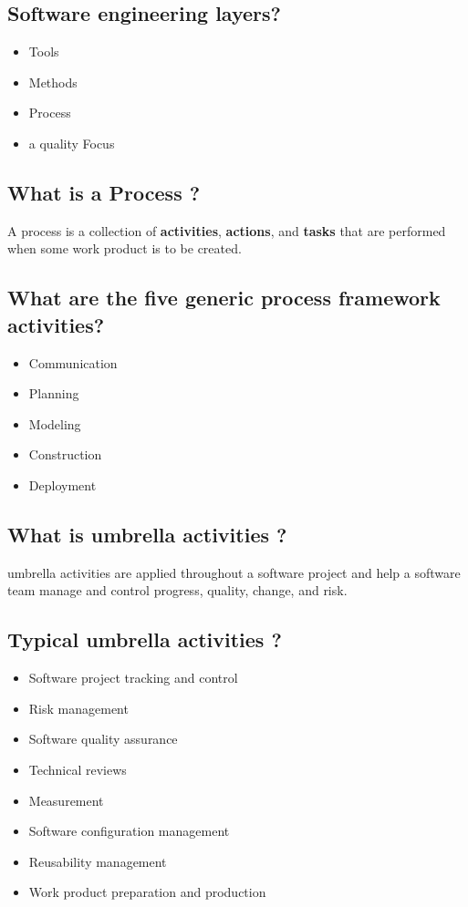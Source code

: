 \documentclass[12pt]{article}
\begin{document}
\subsection{Software engineering layers?}

\begin{itemize}
	\item Tools
	\item Methods
	\item Process
	\item a quality Focus
\end{itemize}


\subsection{What is a Process ?}

A process is a collection of \textbf{activities}, \textbf{actions}, and \textbf{tasks} that are performed when
some work product is to be created.



\subsection{What are the five generic process framework activities?}

\begin{itemize}
	\item Communication
	\item Planning
	\item Modeling
	\item Construction
	\item Deployment
\end{itemize}


\subsection{What is umbrella activities ?}

umbrella activities are applied throughout a software project and help a software team manage and control progress, quality,
change, and risk.

\newpage

\subsection{Typical umbrella activities ?}

\begin{itemize}
	\item Software project tracking and control
	\item Risk management
	\item Software quality assurance
	\item Technical reviews
	\item Measurement
	\item Software configuration management
	\item Reusability management
	\item Work product preparation and production
\end{itemize}
\end{document}
